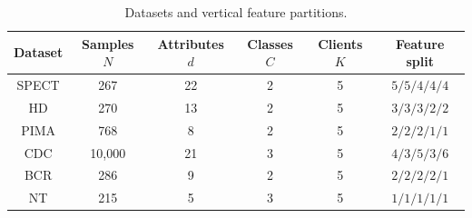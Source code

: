 \begin{table}[!t]
\centering
\caption{Datasets and vertical feature partitions.}
\label{tab:experimental-settings}
\scriptsize
\setlength{\tabcolsep}{2pt}
\begin{tabular*}{\columnwidth}{@{\extracolsep{\fill}}cccccc@{}}
\toprule
\textbf{Dataset} & \textbf{Samples} $N$ & \textbf{Attributes} $d$ & \textbf{Classes} $C$ & \textbf{Clients} $K$ &
\textbf{Feature split}\\
\midrule
SPECT & 267 & 22 & 2 & 5 & \(5/5/4/4/4\)\\
HD & 270 & 13 & 2 & 5 & \(3/3/3/2/2\)\\
PIMA & 768 & 8 & 2 & 5 & \(2/2/2/1/1\)\\
CDC & 10,000 & 21 & 3 & 5 & \(4/3/5/3/6\)\\
BCR & 286 & 9 & 2 & 5 & \(2/2/2/2/1\)\\
NT & 215 & 5 & 3 & 5 & \(1/1/1/1/1\)\\
\bottomrule
\end{tabular*}
\end{table}

